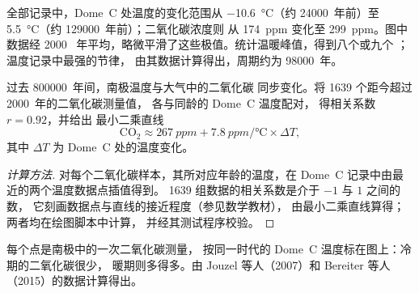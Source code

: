 全部记录中，Dome~C 处温度的变化范围从
\qty{-10.6}{\degreeCelsius}（约 \num{24000}~年前）至
\qty{+5.5}{\degreeCelsius}（约 \num{129000}~年前）；二氧化碳浓度则
从 \qty{174}{ppm} 变化至 \qty{299}{ppm}。图中数据经 \num{2000}~
年平均，略微平滑了这些极值。统计温暖峰值，得到八个或九个
；温度记录中最强的节律，
由其数据计算得出，周期约为 \num{98000}~年。

\begin{proposition}[温度与二氧化碳同步变化]\label{prop:g12:past-climates:correlation}
过去 \num{800000}~年间，南极温度与大气中的二氧化碳
同步变化。将 1639 个距今超过 \num{2000}~年的二氧化碳测量值，
各与同龄的 Dome~C 温度配对，
得相关系数 $r = 0.92$，并给出
最小二乘直线
\[
  \mathrm{CO_2} \approx \qty{267}{ppm} + \qty{7.8}{ppm/\degreeCelsius} \times \Delta T ,
\]
其中 $\Delta T$ 为 Dome~C 处的温度变化。
\end{proposition}

\begin{proof}[计算方法]
对每个二氧化碳样本，其所对应年龄的温度，在
Dome~C 记录中由最近的两个温度数据点插值得到。
1639 组数据的相关系数是介于 $-1$ 与 $1$ 之间的数，
它刻画数据点与直线的接近程度（参见数学教材），
由最小二乘直线算得；两者均在绘图脚本中计算，
并经其测试程序校验。
\end{proof}

\begin{omfigure}

{\small 每个点是南极中的一次二氧化碳测量，
按同一时代的 Dome~C 温度标在图上：冷期的二氧化碳很少，
暖期则多得多。由 Jouzel 等人（2007）和
Bereiter 等人（2015）的数据计算得出。}
\end{omfigure}

